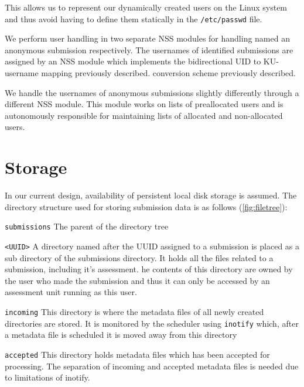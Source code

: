 This allows us to represent our dynamically created users on the Linux
system and thus avoid having to define them statically in the
\texttt{/etc/passwd} file.

We perform user handling in two separate NSS modules for handling
named an anonymous submission respectively. The usernames of
identified submissions are assigned by an NSS module which implements
the bidirectional UID to KU-username mapping previously described.
conversion scheme previously described.

We handle the usernames of anonymous submissions slightly
differently through a different NSS module. This module works on lists
of preallocated users and is autonomously responsible for maintaining
lists of allocated and non-allocated users.%

\section{Storage}
In our current design, availability of persistent local disk storage
is assumed. The directory structure used for storing submission data
is as follows (\cref{fig:filetree}):

\begin{description}
\item{\texttt{submissions}} The parent of the directory tree
\item{\texttt{<UUID>}} A directory named after the UUID assigned to
  a submission is placed as a sub directory of the submissions
  directory. It holds all the files related to a submission, including
  it's assessment.  he contents of this directory are owned by the user
  who made the submission and thus it can only be accessed by an
  assessment unit running as this user.
\item{\texttt{incoming}} This directory is where the metadata files of
  all newly created directories are stored. It is monitored by the
  scheduler using \texttt{inotify} which, after a metadata file is
  scheduled it is moved away from this directory
\item{\texttt{accepted}} This directory holds metadata files which has
  been accepted for processing. The separation of incoming and
  accepted metadata files is needed due to limitations of inotify. %
\end{description}

